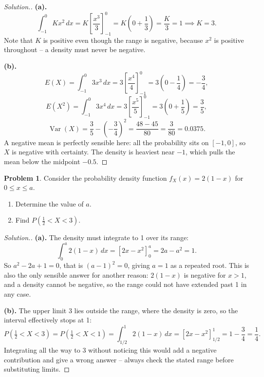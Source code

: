 \documentclass[12pt,a4paper]{report}
\theoremstyle{definition}
\theoremstyle{plain}
\theoremstyle{definition}
\newtheorem{problemx}{Problem}[section]
\newenvironment{problem}{\begin{problemx}}{\end{problemx}}
\newenvironment{solution}
  {\renewcommand{\qedsymbol}{}\begin{proof}[\textit{Solution}.]}
  {\end{proof}}
\begin{document}
\begin{solution}
\textbf{(a).} \[\int_{-1}^{0}Kx^{2}\,dx = K\left[\frac{x^{3}}{3}\right]_{-1}^{0}
 = K\left(0+\frac{1}{3}\right) = \frac{K}{3} = 1 \implies K = 3.\]
Note that $K$ is positive even though the range is negative, because $x^{2}$ is positive
throughout -- a density must never be negative.

\textbf{(b).}
\[E(X) = \int_{-1}^{0}3x^{3}\,dx = 3\left[\frac{x^{4}}{4}\right]_{-1}^{0}
 = 3\left(0-\frac{1}{4}\right) = -\frac{3}{4},\]
\[E(X^{2}) = \int_{-1}^{0}3x^{4}\,dx = 3\left[\frac{x^{5}}{5}\right]_{-1}^{0}
 = 3\left(0+\frac{1}{5}\right) = \frac{3}{5},\]
\[\operatorname{Var}(X) = \frac{3}{5}-\left(-\frac{3}{4}\right)^{2}
 = \frac{48-45}{80} = \frac{3}{80} = 0.0375.\]
A negative mean is perfectly sensible here: all the probability sits on $[-1,0]$, so $X$
is negative with certainty. The density is heaviest near $-1$, which pulls the mean below
the midpoint $-0.5$.
\end{solution}

\begin{problem}
Consider the probability density function $f_X(x) = 2(1-x)$ for $0\leq x\leq a$.
\begin{enumerate}
\item[(a).] Determine the value of $a$.
\item[(b).] Find $P\left(\frac{1}{2}<X<3\right)$.
\end{enumerate}
\end{problem}

\begin{solution}
\textbf{(a).} The density must integrate to 1 over its range:
\[\int_0^{a}2(1-x)\,dx = \left[2x-x^{2}\right]_0^{a} = 2a-a^{2} = 1.\]
So $a^{2}-2a+1 = 0$, that is $(a-1)^{2} = 0$, giving $a = 1$ as a repeated root. This is
also the only sensible answer for another reason: $2(1-x)$ is negative for $x>1$, and a
density cannot be negative, so the range could not have extended past 1 in any case.

\textbf{(b).} The upper limit 3 lies outside the range, where the density is zero, so the
interval effectively stops at 1:
\[P\left(\tfrac12<X<3\right) = P\left(\tfrac12<X<1\right)
 = \int_{1/2}^{1}2(1-x)\,dx = \left[2x-x^{2}\right]_{1/2}^{1}
 = 1-\frac{3}{4} = \frac{1}{4}.\]
Integrating all the way to 3 without noticing this would add a negative contribution and
give a wrong answer -- always check the stated range before substituting limits.
\end{solution}
\end{document}
